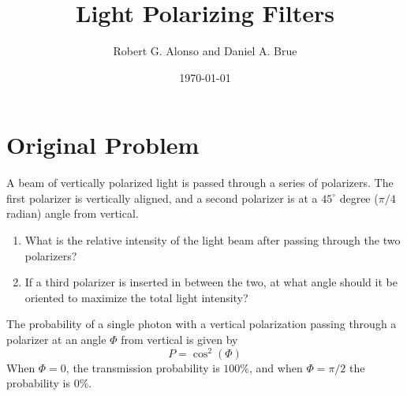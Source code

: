 \documentclass{article}
\begin{document}
\title{Light Polarizing Filters}
\author{Robert G. Alonso and Daniel A. Brue}
\date{\today}
\maketitle

\section{Original Problem}
A beam of vertically polarized light is passed through a series of polarizers.
The first polarizer is vertically aligned, and a second polarizer is at a 
$45^\circ$ degree ($\pi/4$ radian) angle from vertical. 
\begin{enumerate}
    \item What is the relative intensity of the light beam after passing through
        the two polarizers? 
    \item If a third polarizer is inserted in between the two, at what angle 
        should it be oriented to maximize the total light intensity? 
\end{enumerate}

The probability of a single photon with a vertical polarization passing through
a polarizer at an angle $\Phi$ from vertical is given by 
\begin{equation}
P = \cos^2(\Phi)
\end{equation}
When $\Phi=0$, the transmission probability is $100\%$, and when $\Phi=\pi/2$ the
probability is 0\%. 
\end{document}
